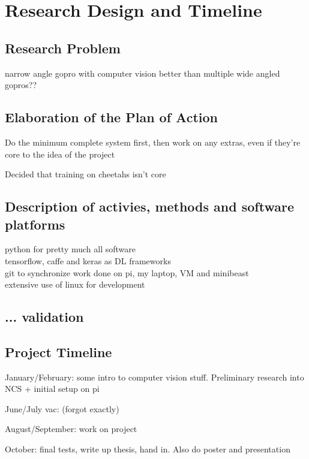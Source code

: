 \chapter{Research Design and Timeline}
\section{Research Problem}
narrow angle gopro with computer vision better than multiple wide angled gopros??
\section{Elaboration of the Plan of Action}
Do the minimum complete system first, then work on any extras, even if they're core to the idea of the project

Decided that training on cheetahs isn't core



\section{Description of activies, methods and software platforms}
python for pretty much all software \\
tensorflow, caffe and keras as DL frameworks \\
git to synchronize work done on pi, my laptop, VM and minibeast \\
extensive use of linux for development



\section{... validation}



\section{Project Timeline}
January/February: some intro to computer vision stuff. Preliminary research into NCS + initial setup on pi

June/July vac: (forgot exactly)

August/September: work on project

October: final tests, write up thesis, hand in. Also do poster and presentation

